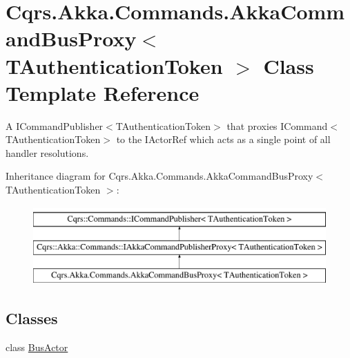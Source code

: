 \hypertarget{classCqrs_1_1Akka_1_1Commands_1_1AkkaCommandBusProxy}{}\section{Cqrs.\+Akka.\+Commands.\+Akka\+Command\+Bus\+Proxy$<$ T\+Authentication\+Token $>$ Class Template Reference}
\label{classCqrs_1_1Akka_1_1Commands_1_1AkkaCommandBusProxy}


A I\+Command\+Publisher$<$\+T\+Authentication\+Token$>$ that proxies I\+Command$<$\+T\+Authentication\+Token$>$ to the I\+Actor\+Ref which acts as a single point of all handler resolutions.  


Inheritance diagram for Cqrs.\+Akka.\+Commands.\+Akka\+Command\+Bus\+Proxy$<$ T\+Authentication\+Token $>$\+:\begin{figure}[H]
\begin{center}
\leavevmode
\includegraphics[height=3.000000cm]{classCqrs_1_1Akka_1_1Commands_1_1AkkaCommandBusProxy}
\end{center}
\end{figure}
\subsection*{Classes}
\begin{DoxyCompactItemize}
\item 
class \hyperlink{classCqrs_1_1Akka_1_1Commands_1_1AkkaCommandBusProxy_1_1BusActor}{Bus\+Actor}
\end{DoxyCompactItemize}
